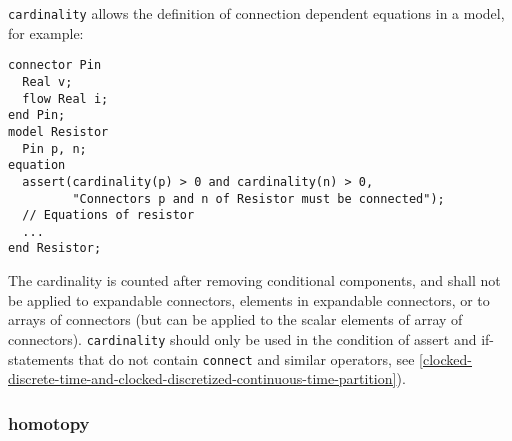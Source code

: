 \begin{nonnormative}
\lstinline!cardinality! allows the definition of connection dependent equations in a model, for example:
\begin{lstlisting}[language=modelica]
connector Pin
  Real v;
  flow Real i;
end Pin;
model Resistor
  Pin p, n;
equation
  assert(cardinality(p) > 0 and cardinality(n) > 0,
         "Connectors p and n of Resistor must be connected");
  // Equations of resistor
  ...
end Resistor;
\end{lstlisting}
\end{nonnormative}

The cardinality is counted after removing conditional components, and shall not be applied to expandable connectors, elements in expandable connectors, or to arrays of connectors (but can be applied to
the scalar elements of array of connectors).  \lstinline!cardinality! should only be used in the condition of assert and if-statements that do not contain \lstinline!connect! and similar operators,
see \cref{clocked-discrete-time-and-clocked-discretized-continuous-time-partition}).

\subsubsection{homotopy}\label{homotopy}


